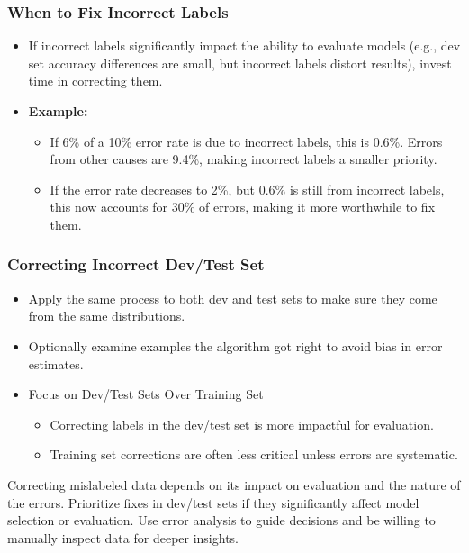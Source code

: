 \documentclass[letterpaper,12pt,notitlepage,twoside]{report}
\begin{document}
\subsubsection{When to Fix Incorrect Labels}
\begin{itemize}
    \item If incorrect labels significantly impact the ability to evaluate models (e.g., dev set accuracy differences are small, but incorrect labels distort results), invest time in correcting them.
    \item \textbf{Example:}
    \begin{itemize}
        \item If 6\% of a 10\% error rate is due to incorrect labels, this is 0.6\%. Errors from other causes are 9.4\%, making incorrect labels a smaller priority.
        \item If the error rate decreases to 2\%, but 0.6\% is still from incorrect labels, this now accounts for 30\% of errors, making it more worthwhile to fix them.
    \end{itemize}
\end{itemize}

\subsubsection*{Correcting Incorrect Dev/Test Set}
\begin{itemize}
    \item Apply the same process to both dev and test sets to make sure they come from the same distributions.
    \item Optionally examine examples the algorithm got right to avoid bias in error estimates.
    \item Focus on Dev/Test Sets Over Training Set
	\begin{itemize}
	    \item Correcting labels in the dev/test set is more impactful for evaluation.
	    \item Training set corrections are often less critical unless errors are systematic.
	\end{itemize}
\end{itemize}

Correcting mislabeled data depends on its impact on evaluation and the nature of the errors. Prioritize fixes in dev/test sets if they significantly affect model selection or evaluation. Use error analysis to guide decisions and be willing to manually inspect data for deeper insights.
\end{document}

